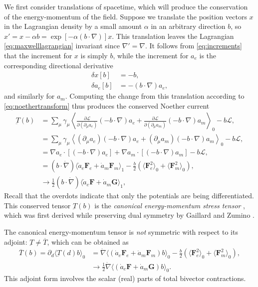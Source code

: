 \documentclass[1p,sort&compress]{elsarticle}
\numberwithin{equation}{section}
\newcommand{\bv}[1]{\mathbf{#1}}
\newcommand{\mean}[1]{\langle #1 \rangle}
\newcommand{\smean}[1]{\left\langle #1 \right\rangle}
\begin{document}

We first consider translations of spacetime, which will produce the conservation of the energy-momentum of the field. Suppose we translate the position vectors $x$ in the Lagrangian density by a small amount $\alpha$ in an arbitrary direction $b$, so $x' = x - \alpha b = \exp[-\alpha(b\cdot\nabla)]x$.  This translation leaves the Lagrangian \eqref{eq:maxwelllagrangian} invariant since $\nabla' = \nabla$.  It follows from \eqref{eq:increments} that the increment for $x$ is simply $b$, while the increment for $a_e$ is the corresponding directional derivative
\begin{subequations}
\begin{align}
  \delta x[b] &= -b, \\
  \delta a_e[b] &= -(b\cdot\nabla)a_e,
\end{align}
\end{subequations}
and similarly for $a_m$.  Computing the change from this translation according to \eqref{eq:noethertransform} thus produces the conserved Noether current 
\begin{align}\label{eq:canonicalemstress}
  \underbar{T}(b) & = \sum_\mu \gamma_\mu\smean{\frac{\partial\mathcal{L}}{\partial(\partial_\mu a_e)}(-b\cdot\nabla)a_e + \frac{\partial\mathcal{L}}{\partial(\partial_\mu a_m)}(-b\cdot\nabla)a_m}_0 - b\mathcal{L}, \\
  &= \sum_\mu \gamma_\mu\smean{(\partial_\mu a_e)(-b\cdot\nabla)a_e + (\partial_\mu a_m)(-b\cdot\nabla)a_m}_0 - b\mathcal{L}, \nonumber \\
  &= \nabla a_e\cdot [(-b\cdot\nabla)a_e]  + \nabla a_m\cdot[(-b\cdot\nabla)a_m] - b\mathcal{L}, \nonumber \\
  &= (b\cdot\dot{\nabla})\mean{\dot{a}_e\bv{F}_e + \dot{a}_m\bv{F}_m}_1 - \frac{b}{2}(\mean{\bv{F}_e^2}_0 + \mean{\bv{F}_m^2}_0), \nonumber \\
  &\to \frac{1}{2}(b\cdot\dot{\nabla})\mean{\dot{a}_e\bv{F} + \dot{a}_m\bv{G}}_1, \nonumber
\end{align}
Recall that the overdots indicate that only the potentials are being differentiated. This conserved tensor $\underbar{T}(b)$ is the \emph{canonical energy-momentum stress tensor} \cite{Soper1976,Bliokh2013}, which was first derived while preserving dual symmetry by Gaillard and Zumino \cite{Gaillard1981}.   

The canonical energy-momentum tensor is \emph{not} symmetric with respect to its adjoint: $\underbar{T} \neq \overline{T}$, which can be obtained as
\begin{align}\label{eq:canonicalemadjoint}
  \overline{T}(b) = \partial_d\mean{\underbar{T}(d)b}_0 &= \dot{\nabla}\mean{(\dot{a}_e\bv{F}_e + \dot{a}_m\bv{F}_m)b}_0 - \frac{b}{2}(\mean{\bv{F}_e^2}_0 + \mean{\bv{F}_m^2}_0), \\
  &\to \frac{1}{2}\dot{\nabla}\mean{(\dot{a}_e\bv{F} + \dot{a}_m\bv{G})b}_0 . \nonumber 
\end{align}
This adjoint form involves the scalar (real) parts of total bivector contractions. 
\end{document}
